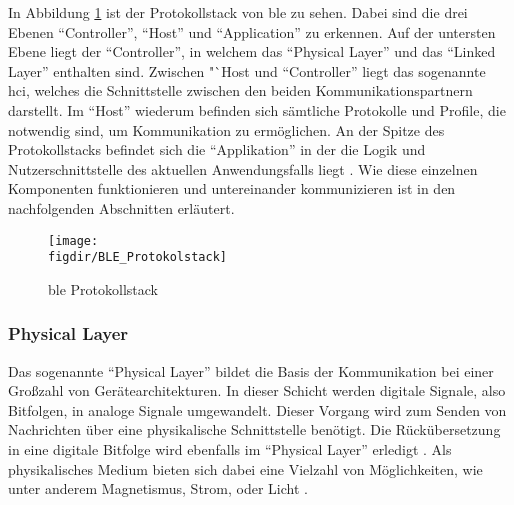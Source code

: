 In Abbildung \ref{FIG:protokollstack} ist der Protokollstack von \ac{ble} zu sehen. Dabei sind die drei Ebenen "`Controller"', "`Host"' und "`Application"' zu erkennen. Auf der untersten Ebene liegt der "`Controller"', in welchem das "`Physical Layer"' und das "`Linked Layer"' enthalten sind. Zwischen "`Host und "`Controller"' liegt das sogenannte \ac{hci}, welches die Schnittstelle zwischen den beiden Kommunikationspartnern darstellt. Im "`Host"' wiederum befinden sich sämtliche Protokolle und Profile, die notwendig sind, um Kommunikation zu ermöglichen. An der Spitze des Protokollstacks befindet sich die "`Applikation"' in der die Logik und Nutzerschnittstelle des aktuellen Anwendungsfalls liegt \cite[15]{Townsend14:GSB}. Wie diese einzelnen Komponenten funktionieren und untereinander kommunizieren ist in den nachfolgenden Abschnitten erläutert.\\  
 
\begin{figure}[h]
\centering
\texttt{[image: \\figdir/BLE\_Protokolstack]}
\caption{\ac{ble} Protokollstack \cite[Seite 16]{Townsend14:GSB}}
\label{FIG:protokollstack}
\end{figure}

\subsubsection{Physical Layer}
\label{sss:funktionsweise:physical}

Das sogenannte "`Physical Layer"' bildet die Basis der Kommunikation bei einer Großzahl von Gerätearchitekturen. In dieser Schicht werden digitale Signale, also Bitfolgen, in analoge Signale umgewandelt. Dieser Vorgang wird zum Senden von Nachrichten über eine physikalische Schnittstelle benötigt. Die Rückübersetzung in eine digitale Bitfolge wird ebenfalls im "`Physical Layer"' erledigt \cite[Seite 16]{Townsend14:GSB}. Als physikalisches Medium bieten sich dabei eine Vielzahl von Möglichkeiten, wie unter anderem Magnetismus, Strom, oder Licht \cite[Seite 95 - 101]{Tanenbaum14:CN}.\\

